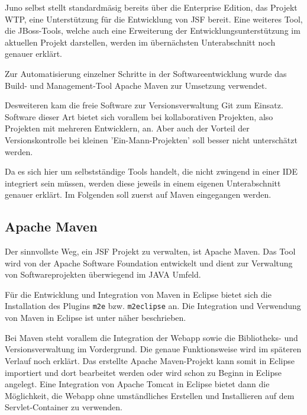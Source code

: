 Juno selbst stellt standardmäsig bereits über die Enterprise Edition, das Projekt WTP, eine Unterstützung für die Entwicklung von JSF bereit. 
Eine weiteres Tool, die \gls{JBoss}-Tools, welche auch eine Erweiterung der Entwicklungsunterstützung im aktuellen Projekt darstellen, werden im übernächsten Unterabschnitt noch genauer erklärt.

Zur Automatisierung einzelner Schritte in der Softwareentwicklung wurde das Build- und Management-Tool Apache Maven zur Umsetzung verwendet. 

Desweiteren kam die freie Software zur Versionsverwaltung \gls{Git} zum Einsatz. Software dieser Art bietet sich vorallem bei kollaborativen Projekten, also Projekten mit mehreren Entwicklern, an. 
Aber auch der Vorteil der Versionskontrolle bei kleinen 'Ein-Mann-Projekten' soll besser nicht unterschätzt werden.

Da es sich hier um selbstständige Tools handelt, die nicht zwingend in einer IDE integriert sein müssen, werden diese jeweils in einem eigenen Unterabschnitt genauer erklärt.
Im Folgenden soll zuerst auf Maven eingegangen werden.

\subsection{Apache Maven}

Der sinnvollste Weg, ein \ac{JSF} Projekt zu verwalten, ist Apache Maven.
Das Tool wird von der \gls{Apache Software Foundation} entwickelt und dient zur Verwaltung von Softwareprojekten überwiegend im JAVA Umfeld. 

Für die Entwicklung und Integration von Maven in Eclipse bietet sich die Installation des Plugins \texttt{m2e} bzw. \texttt{m2eclipse} an. Die Integration und Verwendung von Maven in Eclipse ist unter \cite{EclM2E} näher beschrieben. 

Bei Maven steht vorallem die Integration der Webapp sowie die Bibliotheks- und Versionsverwaltung im Vordergrund. Die genaue Funktionsweise wird im späteren Verlauf noch erklärt. 
Das erstellte \gls{Apache Maven}-Projekt kann somit in Eclipse importiert und dort bearbeitet werden oder wird schon zu Beginn in Eclipse angelegt. 
Eine Integration von \gls{Apache Tomcat} in Eclipse bietet dann die Möglichkeit, die Webapp ohne umständliches Erstellen und Installieren auf dem \gls{Servlet-Container} zu verwenden.

